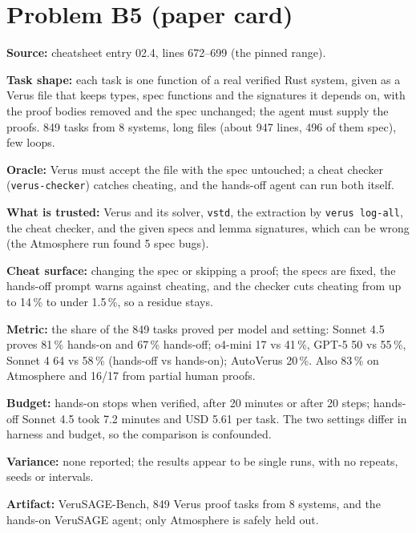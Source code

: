 \documentclass[11pt]{article}
\begin{document}
\section*{Problem B5 (paper card)}\label{ans:B5}
\begin{answer}
\textbf{Source:} cheatsheet entry 02.4, lines 672--699 (the pinned range).

\textbf{Task shape:} each task is one function of a real verified Rust system,
given as a Verus file that keeps types, spec functions and the signatures it
depends on, with the proof bodies removed and the spec unchanged; the agent
must supply the proofs. 849 tasks from 8 systems, long files (about 947 lines,
496 of them spec), few loops.

\textbf{Oracle:} Verus must accept the file with the spec untouched; a cheat
checker (\texttt{verus-checker}) catches cheating, and the hands-off agent can
run both itself.

\textbf{What is trusted:} Verus and its solver, \texttt{vstd}, the extraction
by \texttt{verus log-all}, the cheat checker, and the given specs and lemma
signatures, which can be wrong (the Atmosphere run found 5 spec bugs).

\textbf{Cheat surface:} changing the spec or skipping a proof; the specs are
fixed, the hands-off prompt warns against cheating, and the checker cuts
cheating from up to 14\,\% to under 1.5\,\%, so a residue stays.

\textbf{Metric:} the share of the 849 tasks proved per model and setting:
Sonnet 4.5 proves 81\,\% hands-on and 67\,\% hands-off; o4-mini 17 vs 41\,\%,
GPT-5 50 vs 55\,\%, Sonnet 4 64 vs 58\,\% (hands-off vs hands-on); AutoVerus
20\,\%. Also 83\,\% on Atmosphere and 16/17 from partial human proofs.

\textbf{Budget:} hands-on stops when verified, after 20 minutes or after 20
steps; hands-off Sonnet 4.5 took 7.2 minutes and USD 5.61 per task. The two
settings differ in harness and budget, so the comparison is confounded.

\textbf{Variance:} none reported; the results appear to be single runs, with no
repeats, seeds or intervals.

\textbf{Artifact:} VeruSAGE-Bench, 849 Verus proof tasks from 8 systems, and the
hands-on VeruSAGE agent; only Atmosphere is safely held out.
\end{answer}
\end{document}
